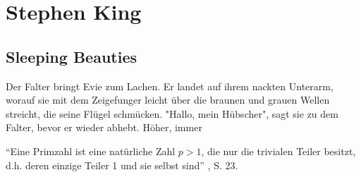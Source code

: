 %
%

\chapter{Stephen King}

\section{Sleeping Beauties}

Der Falter bringt Evie zum Lachen. Er landet auf ihrem
nackten Unterarm, worauf sie mit dem Zeigefunger leicht
über die braunen und grauen Wellen streicht, die seine
Flügel schmücken. "Hallo, mein Hübscher", sagt sie zu
dem Falter, bevor er wieder abhebt. Höher, immer

\begin{definition}[Primzahl]
``Eine Primzahl ist eine natürliche Zahl $p > 1$, die nur 
die trivialen Teiler besitzt, d.h. deren einzige Teiler
1 und sie selbst sind'' \cite{schichlsteinbauer}, S. 23.
\end{definition}
\vspace{-.5cm}

